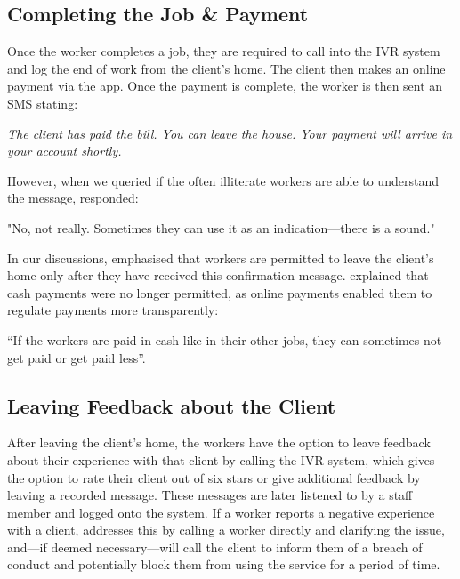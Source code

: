 \subsection{Completing the Job \& Payment}

Once the worker completes a job, they are required to call into the IVR system and log the end of work from the client’s home. The client then makes an online payment via the \PC{} app. Once the payment is complete, the worker is then sent an SMS stating:

\begin{displayquote}
\textit{The client has paid the bill. You can leave the house. Your payment will arrive in your account shortly.}
\end{displayquote}

However, when we queried if the often illiterate workers are able to understand the message, \PC{} responded:

\begin{displayquote}
"No, not really. Sometimes they can use it as an indication---there is a sound."
\end{displayquote}

In our discussions, \PC{} emphasised that workers are permitted to leave the client’s home only after they have received this confirmation message. \PC{} explained that cash payments were no longer permitted, as online payments enabled them to regulate payments more transparently:

\begin{displayquote}
“If the workers are paid in cash like in their other jobs, they can sometimes not get paid or get paid less”. 
\end{displayquote}


\subsection{Leaving Feedback about the Client}

After leaving the client’s home, the workers have the option to leave feedback about their experience with that client by calling the IVR system, which gives the option to rate their client out of six stars or give additional feedback by leaving a recorded message. These messages are later listened to by a \PC{} staff member and logged onto the system. If a worker reports a negative experience with a client, \PC{} addresses this by calling a worker directly and clarifying the issue, and---if deemed necessary---will call the client to inform them of a breach of conduct and potentially block them from using the service for a period of time. 